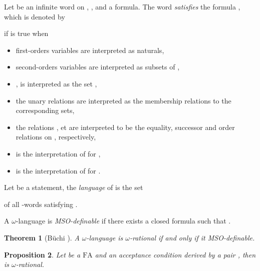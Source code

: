 \documentclass[preprint]{elsarticle}
\newcommand{\Nlanguage}{\ensuremath{\omega}-language\xspace}
\newcommand{\Nrational}{\ensuremath{\omega}-rational\xspace}
\newcommand{\FA}{\ensuremath{\mathrm{FA}}\xspace}
\newtheorem{theorem}{Theorem}[section]
\newtheorem{proposition}[theorem]{Proposition}
\begin{document}
\begin{definition}
Let  be an infinite word on , ,  and   a formula. The word  \emph{satisfies} the formula , which is denoted by

if  is true when
\begin{itemize}
\item
first-orders variables are interpreted as naturals,
\item
second-orders variables are interpreted as subsets of ,
\item
,  is interpreted as the set ,
\item
the unary relations are interpreted as the membership relations to the corresponding sets,
\item
the relations ,  et  are interpreted to be the equality, successor and order relations on , respectively,
\item
 is the interpretation of  for ,
\item
 is the interpretation of  for .
\end{itemize}
\end{definition}

\begin{definition}
Let  be a statement, the \emph{language} of  is the set

of all -words satisfying .

A \Nlanguage  is \emph{MSO-definable} if there exists a closed formula  such that .
\end{definition}

\begin{theorem}[B\"uchi \cite{Buchi1960}]
\label{th:buchi}
A \Nlanguage is \Nrational if and only if it MSO-definable.
\end{theorem}

\begin{proposition}
\label{prop:all_rat}
Let  be a \FA and  an acceptance condition derived by a pair , then  is \Nrational.
\end{proposition}
\end{document}
